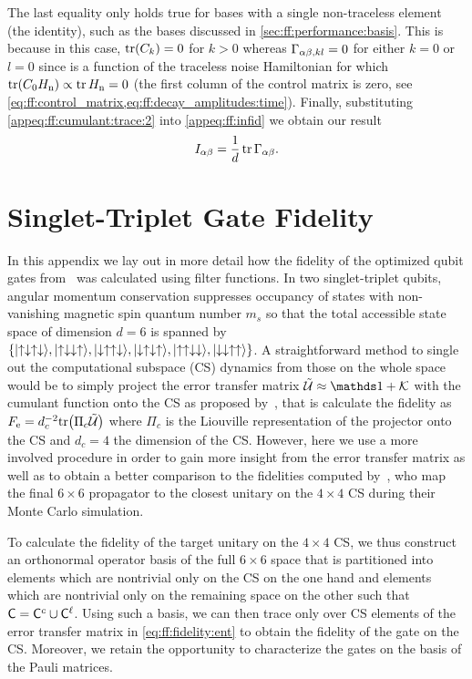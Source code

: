 The last equality only holds true for bases with a single non-traceless element (the identity), such as the bases discussed in \cref{sec:ff:performance:basis}.
This is because in this case, $\tr(C_k) = 0$ for $k > 0$ whereas $\Gamma_{\alpha\beta,kl} = 0$ for either $k = 0$ or $l = 0$ since \decayamps is a function of the traceless noise Hamiltonian for which $\tr(C_0H_{\mathrm{n}}) \propto \tr H_{\mathrm{n}} = 0$ (\ie the first column of the control matrix is zero, see \cref{eq:ff:control_matrix,eq:ff:decay_amplitudes:time}).
Finally, substituting \cref{appeq:ff:cumulant:trace:2} into \cref{appeq:ff:infid} we obtain our result
\begin{equation}
    I_{\alpha\beta} = \frac{1}{d}\tr\Gamma_{\alpha\beta}.
\end{equation}
\section{Singlet-Triplet Gate Fidelity}\label{sec:app:ff:singlet-triplet}
In this appendix we lay out in more detail how the fidelity of the optimized \sts qubit gates from~ was calculated using filter functions.
In two singlet-triplet qubits, angular momentum conservation suppresses occupancy of states with non-vanishing magnetic spin quantum number $m_s$ so that the total accessible state space of dimension $d=6$ is spanned by $\lbrace\mbox{\ensuremath{\ket{\uparrow\downarrow\uparrow\downarrow}}},\mbox{\ensuremath{\ket{\uparrow\downarrow\downarrow\uparrow}}},\mbox{\ensuremath{\ket{\downarrow\uparrow\uparrow\downarrow}}},\mbox{\ensuremath{\ket{\downarrow\uparrow\downarrow\uparrow}}},\mbox{\ensuremath{\ket{\uparrow\uparrow\downarrow\downarrow}}},\mbox{\ensuremath{\ket{\downarrow\downarrow\uparrow\uparrow}}}\rbrace$.
A straightforward method to single out the computational subspace (CS) dynamics from those on the whole space would be to simply project the error transfer matrix $\liouvUe\approx\eye + \cumulantfun$ with \cumulantfun the cumulant function onto the CS as proposed by~\citet{Wood2018}, that is calculate the fidelity as $F_{\mathrm{e}} = d_c^{-2}\mathrm{tr}\bigl(\Pi_c\mathcal{\tilde{U}}\bigr)$ where $\Pi_c$ is the Liouville representation of the projector onto the CS and $d_c = 4$ the dimension of the CS.
However, here we use a more involved procedure in order to gain more insight from the error transfer matrix as well as to obtain a better comparison to the fidelities computed by~\citet{Cerfontaine2020}, who map the final $6\times 6$ propagator to the closest unitary on the $4\times 4$ CS during their Monte Carlo simulation.

To calculate the fidelity of the target unitary on the $4\times 4$ CS, we thus construct an orthonormal operator basis \basis of the full $6\times 6$ space that is partitioned into elements which are nontrivial only on the CS on the one hand and elements which are nontrivial only on the remaining space on the other such that $\mathsf{C} = \mathsf{C}^c\cup\mathsf{C}^\ell$.
Using such a basis, we can then trace only over CS elements of the error transfer matrix \liouvUe in \cref{eq:ff:fidelity:ent} to obtain the fidelity of the gate on the CS.
Moreover, we retain the opportunity to characterize the gates on the basis of the Pauli matrices.

